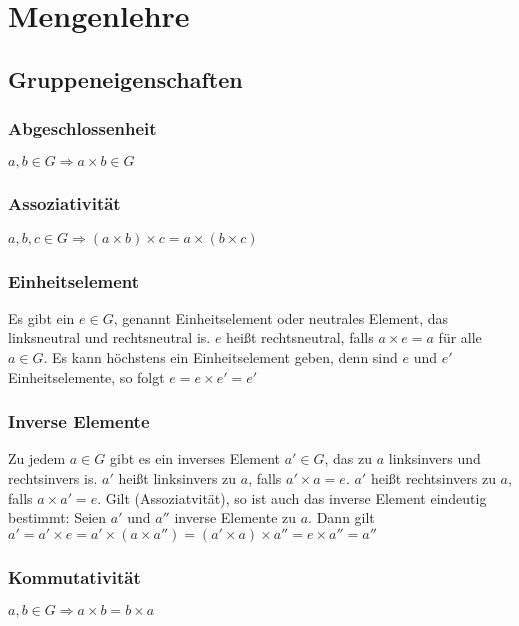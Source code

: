 
\section{Mengenlehre} %
\label{sec:mengenlehre}

\subsection{Gruppeneigenschaften} %
\label{sub:gruppeneigenschaften}
  \subsubsection{Abgeschlossenheit} %
  \label{ssub:abgeschlossenheit}
    $a, b \in G \Rightarrow a \times b \in G $
  \subsubsection{Assoziativität} %
  \label{ssub:assoziativitaet}
    $a,b,c \in G \Rightarrow (a \times b) \times c = a \times (b \times c)$
  \subsubsection{Einheitselement} %
  \label{ssub:einheitselement}
    Es gibt ein $e \in G$, genannt Einheitselement oder neutrales Element, das linksneutral und rechtsneutral is. $e$ heißt rechtsneutral, falls $a \times e = a$ für alle $a \in G$. Es kann höchstens ein Einheitselement geben, denn sind $e$ und $e'$ Einheitselemente, so folgt $e=e \times e'=e'$
  \subsubsection{Inverse Elemente} %
  \label{ssub:inverse_elemente}
    Zu jedem $a \in G$ gibt es ein inverses Element $a' \in G$, das zu $a$ linksinvers und rechtsinvers is. $a'$ heißt linksinvers zu $a$, falls $a' \times a = e$. $a'$ heißt rechtsinvers zu $a$, falls $a \times a' = e$.
    Gilt (Assoziatvität), so ist auch das inverse Element eindeutig bestimmt: Seien $a'$ und $a''$ inverse Elemente zu $a$.
    Dann gilt $a'=a' \times e=a' \times (a \times a'')=(a' \times a) \times a''=e \times a'' = a''$
  
  \subsubsection{Kommutativität} %
  \label{ssub:kommutativitaet}
    $a,b \in G \Rightarrow a \times b = b \times a$

